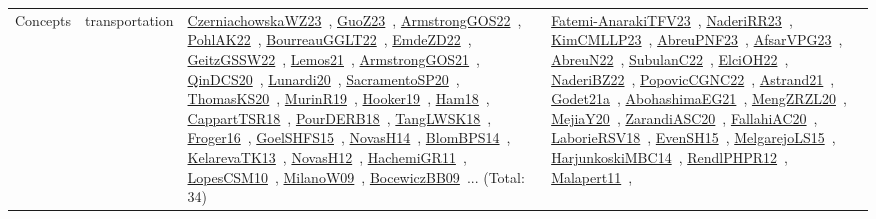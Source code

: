 {\begin{longtable}{lp{3cm}>{\raggedright\arraybackslash}p{6cm}>{\raggedright\arraybackslash}p{6cm}>{\raggedright\arraybackslash}p{8cm}}
Concepts & transportation & \href{works/CzerniachowskaWZ23.pdf}{CzerniachowskaWZ23}~\cite{CzerniachowskaWZ23}, \href{works/GuoZ23.pdf}{GuoZ23}~\cite{GuoZ23}, \href{works/ArmstrongGOS22.pdf}{ArmstrongGOS22}~\cite{ArmstrongGOS22}, \href{works/PohlAK22.pdf}{PohlAK22}~\cite{PohlAK22}, \href{works/BourreauGGLT22.pdf}{BourreauGGLT22}~\cite{BourreauGGLT22}, \href{works/EmdeZD22.pdf}{EmdeZD22}~\cite{EmdeZD22}, \href{works/GeitzGSSW22.pdf}{GeitzGSSW22}~\cite{GeitzGSSW22}, \href{works/Lemos21.pdf}{Lemos21}~\cite{Lemos21}, \href{works/ArmstrongGOS21.pdf}{ArmstrongGOS21}~\cite{ArmstrongGOS21}, \href{works/QinDCS20.pdf}{QinDCS20}~\cite{QinDCS20}, \href{works/Lunardi20.pdf}{Lunardi20}~\cite{Lunardi20}, \href{works/SacramentoSP20.pdf}{SacramentoSP20}~\cite{SacramentoSP20}, \href{works/ThomasKS20.pdf}{ThomasKS20}~\cite{ThomasKS20}, \href{works/MurinR19.pdf}{MurinR19}~\cite{MurinR19}, \href{works/Hooker19.pdf}{Hooker19}~\cite{Hooker19}, \href{works/Ham18.pdf}{Ham18}~\cite{Ham18}, \href{works/CappartTSR18.pdf}{CappartTSR18}~\cite{CappartTSR18}, \href{works/PourDERB18.pdf}{PourDERB18}~\cite{PourDERB18}, \href{works/TangLWSK18.pdf}{TangLWSK18}~\cite{TangLWSK18}, \href{works/Froger16.pdf}{Froger16}~\cite{Froger16}, \href{works/GoelSHFS15.pdf}{GoelSHFS15}~\cite{GoelSHFS15}, \href{works/NovasH14.pdf}{NovasH14}~\cite{NovasH14}, \href{works/BlomBPS14.pdf}{BlomBPS14}~\cite{BlomBPS14}, \href{works/KelarevaTK13.pdf}{KelarevaTK13}~\cite{KelarevaTK13}, \href{works/NovasH12.pdf}{NovasH12}~\cite{NovasH12}, \href{works/HachemiGR11.pdf}{HachemiGR11}~\cite{HachemiGR11}, \href{works/LopesCSM10.pdf}{LopesCSM10}~\cite{LopesCSM10}, \href{works/MilanoW09.pdf}{MilanoW09}~\cite{MilanoW09}, \href{works/BocewiczBB09.pdf}{BocewiczBB09}~\cite{BocewiczBB09}... (Total: 34) & \href{works/Fatemi-AnarakiTFV23.pdf}{Fatemi-AnarakiTFV23}~\cite{Fatemi-AnarakiTFV23}, \href{works/NaderiRR23.pdf}{NaderiRR23}~\cite{NaderiRR23}, \href{works/KimCMLLP23.pdf}{KimCMLLP23}~\cite{KimCMLLP23}, \href{works/AbreuPNF23.pdf}{AbreuPNF23}~\cite{AbreuPNF23}, \href{works/AfsarVPG23.pdf}{AfsarVPG23}~\cite{AfsarVPG23}, \href{works/AbreuN22.pdf}{AbreuN22}~\cite{AbreuN22}, \href{works/SubulanC22.pdf}{SubulanC22}~\cite{SubulanC22}, \href{works/ElciOH22.pdf}{ElciOH22}~\cite{ElciOH22}, \href{works/NaderiBZ22.pdf}{NaderiBZ22}~\cite{NaderiBZ22}, \href{works/PopovicCGNC22.pdf}{PopovicCGNC22}~\cite{PopovicCGNC22}, \href{works/Astrand21.pdf}{Astrand21}~\cite{Astrand21}, \href{works/Godet21a.pdf}{Godet21a}~\cite{Godet21a}, \href{works/AbohashimaEG21.pdf}{AbohashimaEG21}~\cite{AbohashimaEG21}, \href{works/MengZRZL20.pdf}{MengZRZL20}~\cite{MengZRZL20}, \href{works/MejiaY20.pdf}{MejiaY20}~\cite{MejiaY20}, \href{works/ZarandiASC20.pdf}{ZarandiASC20}~\cite{ZarandiASC20}, \href{works/FallahiAC20.pdf}{FallahiAC20}~\cite{FallahiAC20}, \href{works/LaborieRSV18.pdf}{LaborieRSV18}~\cite{LaborieRSV18}, \href{works/EvenSH15.pdf}{EvenSH15}~\cite{EvenSH15}, \href{works/MelgarejoLS15.pdf}{MelgarejoLS15}~\cite{MelgarejoLS15}, \href{works/HarjunkoskiMBC14.pdf}{HarjunkoskiMBC14}~\cite{HarjunkoskiMBC14}, \href{works/RendlPHPR12.pdf}{RendlPHPR12}~\cite{RendlPHPR12}, \href{works/Malapert11.pdf}{Malapert11}~\cite{Malapert11}, 
\end{longtable}}
